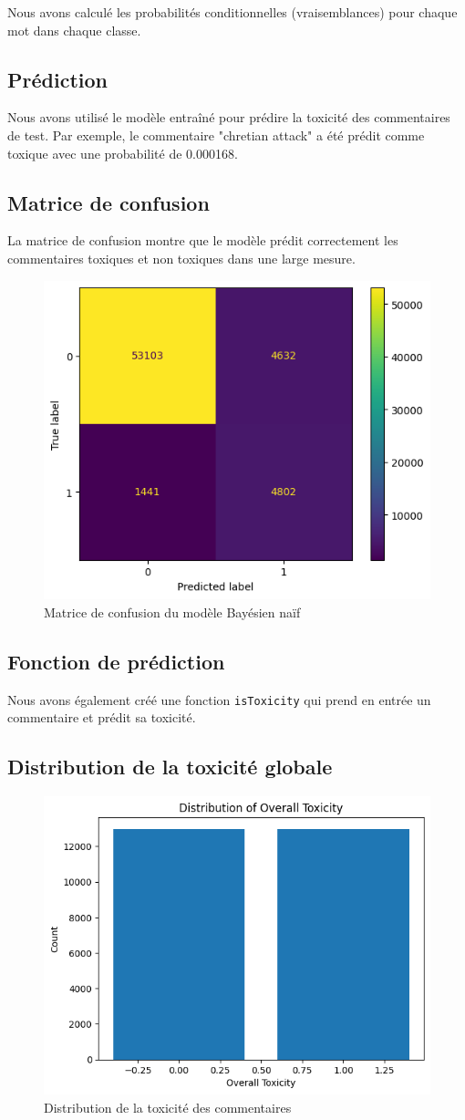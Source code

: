 Nous avons calculé les probabilités conditionnelles (vraisemblances) pour chaque mot dans chaque classe.

\subsection{Prédiction}

Nous avons utilisé le modèle entraîné pour prédire la toxicité des commentaires de test. Par exemple, le commentaire "chretian attack" a été prédit comme toxique avec une probabilité de 0.000168.

\subsection{Matrice de confusion}

La matrice de confusion montre que le modèle prédit correctement les commentaires toxiques et non toxiques dans une large mesure.

\begin{figure}[h]
    \centering
    \includegraphics[width=.49\linewidth]{figures/matrix-confusion-naive_bayes.png}
    \caption{Matrice de confusion du modèle Bayésien naïf}
\end{figure}

\subsection{Fonction de prédiction}

Nous avons également créé une fonction \texttt{isToxicity} qui prend en entrée un commentaire et prédit sa toxicité.

\subsection{Distribution de la toxicité globale}

\begin{figure}[h]
    \centering
    \includegraphics[width=.47\linewidth]{figures/distribution-toxicity-naive_bayes.png}
    \caption{Distribution de la toxicité des commentaires}
\end{figure}


